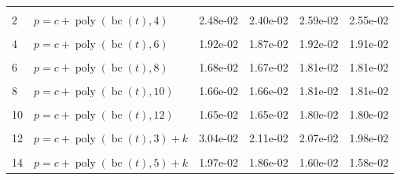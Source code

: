 \documentclass[12pt,a4paper]{article}
\DeclareMathOperator{\bc}{bc}
\DeclareMathOperator{\poly}{poly}
\begin{document}
\begin{longtable}[t]{ll>{\raggedleft\arraybackslash}p{2cm}>{\raggedleft\arraybackslash}p{2cm}>{\raggedleft\arraybackslash}p{2cm}>{\raggedleft\arraybackslash}p{2cm}}
\endfoot
\bottomrule
\endlastfoot
\cellcolor{gray!6}{1} & \cellcolor{gray!6}{$p = c + \poly\left( \bc(t), 3 \right)$} & \cellcolor{gray!6}{3.21e-02} & \cellcolor{gray!6}{2.38e-02} & \cellcolor{gray!6}{2.51e-02} & \cellcolor{gray!6}{2.45e-02}\\
2 & $p = c + \poly\left( \bc(t), 4 \right)$ & 2.48e-02 & 2.40e-02 & 2.59e-02 & 2.55e-02\\
\cellcolor{gray!6}{3} & \cellcolor{gray!6}{$p = c + \poly\left( \bc(t), 5 \right)$} & \cellcolor{gray!6}{2.23e-02} & \cellcolor{gray!6}{2.16e-02} & \cellcolor{gray!6}{2.15e-02} & \cellcolor{gray!6}{2.15e-02}\\
4 & $p = c + \poly\left( \bc(t), 6 \right)$ & 1.92e-02 & 1.87e-02 & 1.92e-02 & 1.91e-02\\
\cellcolor{gray!6}{5} & \cellcolor{gray!6}{$p = c + \poly\left( \bc(t), 7 \right)$} & \cellcolor{gray!6}{1.82e-02} & \cellcolor{gray!6}{1.78e-02} & \cellcolor{gray!6}{1.95e-02} & \cellcolor{gray!6}{1.90e-02}\\
6 & $p = c + \poly\left( \bc(t), 8 \right)$ & 1.68e-02 & 1.67e-02 & 1.81e-02 & 1.81e-02\\
\cellcolor{gray!6}{7} & \cellcolor{gray!6}{$p = c + \poly\left( \bc(t), 9 \right)$} & \cellcolor{gray!6}{1.67e-02} & \cellcolor{gray!6}{1.66e-02} & \cellcolor{gray!6}{1.82e-02} & \cellcolor{gray!6}{1.81e-02}\\
8 & $p = c + \poly\left( \bc(t), 10 \right)$ & 1.66e-02 & 1.66e-02 & 1.81e-02 & 1.81e-02\\
\cellcolor{gray!6}{9} & \cellcolor{gray!6}{$p = c + \poly\left( \bc(t), 11 \right)$} & \cellcolor{gray!6}{1.65e-02} & \cellcolor{gray!6}{1.65e-02} & \cellcolor{gray!6}{1.80e-02} & \cellcolor{gray!6}{1.80e-02}\\
10 & $p = c + \poly\left( \bc(t), 12 \right)$ & 1.65e-02 & 1.65e-02 & 1.80e-02 & 1.80e-02\\
\cellcolor{gray!6}{11} & \cellcolor{gray!6}{$p = c + \poly\left( \bc(t), 13 \right)$} & \cellcolor{gray!6}{1.65e-02} & \cellcolor{gray!6}{1.65e-02} & \cellcolor{gray!6}{1.80e-02} & \cellcolor{gray!6}{1.80e-02}\\
12 & $p = c + \poly\left( \bc(t), 3 \right) + k$ & 3.04e-02 & 2.11e-02 & 2.07e-02 & 1.98e-02\\
\cellcolor{gray!6}{13} & \cellcolor{gray!6}{$p = c + \poly\left( \bc(t), 4 \right) + k$} & \cellcolor{gray!6}{2.25e-02} & \cellcolor{gray!6}{2.14e-02} & \cellcolor{gray!6}{2.16e-02} & \cellcolor{gray!6}{2.10e-02}\\
14 & $p = c + \poly\left( \bc(t), 5 \right) + k$ & 1.97e-02 & 1.86e-02 & 1.60e-02 & 1.58e-02\\

\end{longtable}
\end{document}
